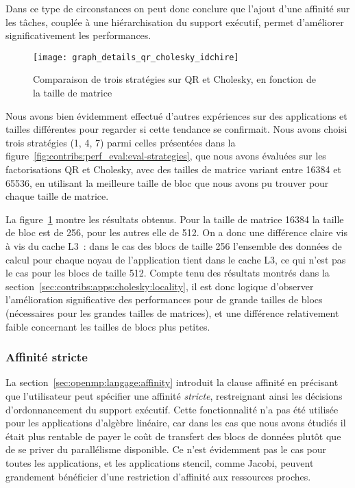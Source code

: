 Dans ce type de circonstances on peut donc conclure que l'ajout d'une affinité sur les tâches, couplée à une hiérarchisation du support exécutif, permet d'améliorer significativement les performances.


\begin{figure}[h!]
  \centering
  \texttt{[image: graph\_details\_qr\_cholesky\_idchire]}
  \caption{Comparaison de trois stratégies sur QR et Cholesky, en fonction de la taille de matrice}\label{fig:contribs:perf_eval:eval-qr-cholesky}
\end{figure}

Nous avons bien évidemment effectué d'autres expériences sur des applications et tailles différentes pour regarder si cette tendance se confirmait. Nous avons choisi trois stratégies (1, 4, 7) parmi celles présentées dans la figure~\ref{fig:contribs:perf_eval:eval-strategies}, que nous avons évaluées sur les factorisations QR et Cholesky, avec des tailles de matrice variant entre 16384 et 65536, en utilisant la meilleure taille de bloc que nous avons pu trouver pour chaque taille de matrice.

La figure~\ref{fig:contribs:perf_eval:eval-qr-cholesky} montre les résultats obtenus.
Pour la taille de matrice 16384 la taille de bloc est de 256, pour les autres elle de 512.
On a donc une différence claire vis à vis du cache L3~: dans le cas des blocs de taille 256 l'ensemble des données de calcul pour chaque noyau de l'application tient dans le cache L3, ce qui n'est pas le cas pour les blocs de taille 512.
Compte tenu des résultats montrés dans la section~\ref{sec:contribs:apps:cholesky:locality}, il est donc logique d'observer l'amélioration significative des performances pour de grande tailles de blocs (nécessaires pour les grandes tailles de matrices), et une différence relativement faible concernant les tailles de blocs plus petites.


\subsubsection{Affinité stricte}

La section~\ref{sec:openmp:langage:affinity} introduit la clause affinité en précisant que l'utilisateur peut spécifier une affinité \emph{stricte}, restreignant ainsi les décisions d'ordonnancement du support exécutif.
Cette fonctionnalité n'a pas été utilisée pour les applications d'algèbre linéaire, car dans les cas que nous avons étudiés il était plus rentable de payer le coût de transfert des blocs de données plutôt que de se priver du parallélisme disponible.
Ce n'est évidemment pas le cas pour toutes les applications, et les applications stencil, comme Jacobi, peuvent grandement bénéficier d'une restriction d'affinité aux ressources proches.

